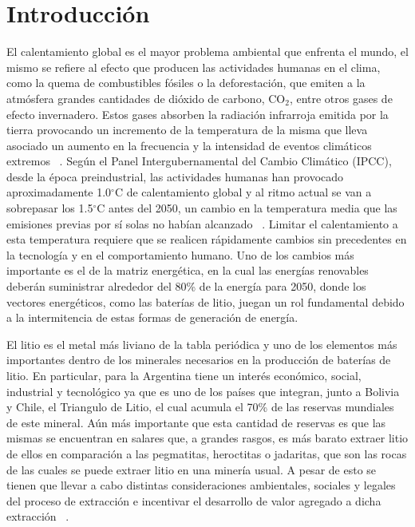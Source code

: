 \chapter[Introducción]{Introducción}
\thispagestyle{empty}

\clearpage
\newpage
\thispagestyle{empty}
\mbox{}
\newpage


El calentamiento global es el mayor problema ambiental que enfrenta el mundo, el 
mismo se refiere al efecto que producen las actividades humanas en el clima, como 
la quema de combustibles fósiles o la deforestación, que emiten a la atmósfera
grandes cantidades de dióxido de carbono, CO$_2$, entre otros gases de efecto 
invernadero. Estos gases absorben la radiación infrarroja emitida por la tierra 
provocando un incremento de la temperatura de la misma que lleva asociado un 
aumento en la frecuencia y la intensidad de eventos climáticos extremos 
~\cite{houghton2005}. Según el Panel Intergubernamental del Cambio Climático 
(IPCC), desde la época preindustrial, las actividades humanas han provocado 
aproximadamente 1.0$^{\circ}$C de calentamiento global y al ritmo actual se van 
a sobrepasar los 1.5$^{\circ}$C antes del 2050, un cambio en la temperatura
media que las emisiones previas por sí solas no habían alcanzado
~\cite{harvey2018}. Limitar el calentamiento a esta temperatura requiere que se 
realicen rápidamente cambios sin precedentes en la tecnología y en el 
comportamiento humano. Uno de los cambios más importante es el de la matriz 
energética, en la cual las energías renovables deberán suministrar alrededor del 
80\% de la energía para 2050, donde los vectores energéticos, como las baterías 
de litio, juegan un rol fundamental debido a la intermitencia de estas formas de 
generación de energía.

El litio es el metal más liviano de la tabla periódica y uno de los elementos más
importantes dentro de los minerales necesarios en la producción de baterías de
litio. En particular, para la Argentina tiene un interés económico, social, 
industrial y tecnológico ya que es uno de los países que integran, junto a 
Bolivia y Chile, el Triangulo de Litio, el cual acumula el 70\% de las reservas 
mundiales de este mineral. Aún más importante que esta cantidad de reservas es 
que las mismas se encuentran en salares que, a grandes rasgos, es más barato
extraer litio de ellos en comparación a las pegmatitas, heroctitas o jadaritas, 
que son las rocas de las cuales se puede extraer litio en una minería usual.
A pesar de esto se tienen que llevar a cabo distintas consideraciones ambientales,
sociales y legales del proceso de extracción e incentivar el desarrollo de valor
agregado a dicha extracción ~\cite{heredia2020}.

